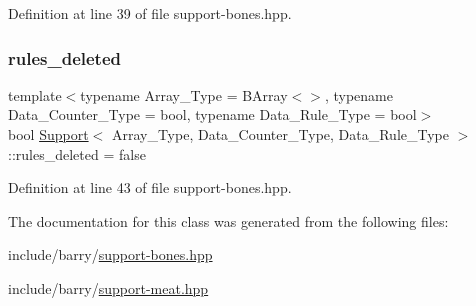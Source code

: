 Definition at line 39 of file support-\/bones.\+hpp.

\mbox{\label{class_support_aab64eca42c25f48f7688eae0bbe9f1ef}} 
\subsubsection{\texorpdfstring{rules\+\_\+deleted}{rules\_deleted}}
{\footnotesize\ttfamily template$<$typename Array\+\_\+\+Type = B\+Array$<$$>$, typename Data\+\_\+\+Counter\+\_\+\+Type = bool, typename Data\+\_\+\+Rule\+\_\+\+Type = bool$>$ \\
bool \hyperlink{class_support}{Support}$<$ Array\+\_\+\+Type, Data\+\_\+\+Counter\+\_\+\+Type, Data\+\_\+\+Rule\+\_\+\+Type $>$\+::rules\+\_\+deleted = false}



Definition at line 43 of file support-\/bones.\+hpp.



The documentation for this class was generated from the following files\+:\begin{DoxyCompactItemize}
\item 
include/barry/\hyperlink{support-bones_8hpp}{support-\/bones.\+hpp}\item 
include/barry/\hyperlink{support-meat_8hpp}{support-\/meat.\+hpp}\end{DoxyCompactItemize}
